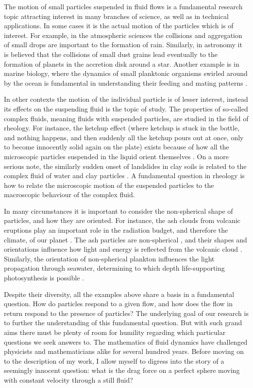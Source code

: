 \documentclass[thesis.tex]{subfiles}
\begin{document}
The motion of small particles suspended in fluid flows is a fundamental research topic attracting interest in many branches of science, as well as in technical applications. In some cases it is the actual motion of the particles which is of interest. For example, in the atmospheric sciences the collisions and aggregation of small drops are important to the formation of rain. Similarly, in astronomy it is believed that the collisions of small dust grains lead eventually to the formation of planets in the accretion disk around a star. Another example is in marine biology, where the dynamics of small planktonic organisms swirled around by the ocean is fundamental in understanding their feeding and mating patterns \cite{guasto2012}. 

In other contexts the motion of the individual particle is of lesser interest, instead its effects on the suspending fluid is the topic of study. The properties of so-called complex fluids, meaning fluids with suspended particles, are studied in the field of rheology. For instance, the ketchup effect (where ketchup is stuck in the bottle, and nothing happens, and then suddenly all the ketchup pours out at once, only to become innocently solid again on the plate) exists because of how all the microscopic particles suspended in the liquid orient themselves \cite{bayod2008}. On a more serious note, the similarly sudden onset of landslides in clay soils is related to the complex fluid of water and clay particles \cite{coussot2002}. A fundamental question in rheology is how to relate the microscopic motion of the suspended particles to the macroscopic behaviour of the complex fluid.

In many circumstances it is important to consider the non-spherical shape of particles, and how they are oriented. For instance, the ash clouds from volcanic eruptions play an important role in the radiation budget, and therefore the climate, of our planet \cite{mather2003}. The ash particles are non-spherical \cite{gasteiger2011}, and their shapes and orientations influence how light and energy is reflected from the volcanic cloud \cite{dubovik2002}. Similarly, the orientation of non-spherical plankton influences the light propagation through seawater, determining to which depth life-supporting photosynthesis is possible \cite{marcos2011}. 

Despite their diversity, all the examples above share a basis in a fundamental question. How do particles respond to a given flow, and how does the flow in return respond to the presence of particles? The underlying goal of our research is to further the understanding of this fundamental question. But with such grand aims there must be plenty of room for humility regarding which particular questions we seek answers to. The mathematics of fluid dynamics have challenged physicists and mathematicians alike for several hundred years. Before moving on to the description of my work, I allow myself to digress into the story of a seemingly innocent question: what is the drag force on a perfect sphere moving with constant velocity through a still fluid?
\end{document}
